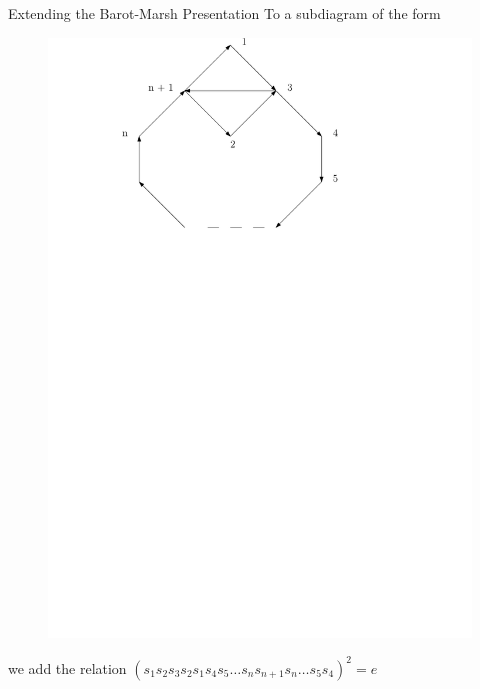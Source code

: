 \documentclass{beamer}
\begin{document}
\begin{frame}{Extending the Barot-Marsh Presentation}
To a subdiagram of the form 
\begin{figure}
\includegraphics[scale = .50]{Diagram2.pdf}
\end{figure}
we add the relation $(s_{1}s_{2}s_{3}s_{2}s_{1}s_{4}s_{5} \dots s_{n}s_{n+1}s_{n} \dots s_{5}s_{4})^{2} = e$
\end{frame}
\end{document}
